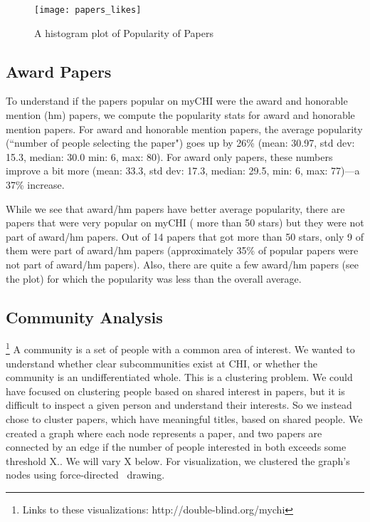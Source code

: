 \documentclass{sigchi}
\begin{document}
\begin{figure}[!h]
\centering
\texttt{[image: papers\_likes]}
\caption{A histogram plot of Popularity of Papers}
\label{fig:A histogram plot of Number of People Starred (any single paper)}
\end{figure}



\subsection{Award Papers}

To understand if the papers popular on myCHI were the award and honorable mention (hm) papers, we compute the popularity stats for award and honorable mention papers. For award and honorable mention papers, the average popularity (``number of people selecting the paper") goes up by 26\% (mean: 30.97, std dev: 15.3, median: 30.0 min: 6, max: 80). For award only papers, these numbers improve a bit more (mean: 33.3, std dev: 17.3,  median: 29.5, min: 6, max: 77)---a 37\% increase.

While we see that award/hm papers have better average popularity,  there are papers that were very popular on myCHI ( more than 50 stars) but they were not part of award/hm papers. Out of 14 papers that got more than 50 stars, only 9 of them were part of award/hm papers (approximately 35\% of popular papers were not part of award/hm papers). Also, there are quite a few award/hm papers (see the plot) for which the popularity was less than the overall average.





\subsection{Community Analysis}
\footnote[1]{Links to these visualizations: http://double-blind.org/mychi}
A community is a set of people with a common area of interest. We wanted to understand whether clear subcommunities exist at CHI, or whether the community is an undifferentiated whole.  This is a clustering problem. We could have focused on clustering people based on shared interest in papers, but it is difficult to inspect a given person and understand their interests.  So we instead chose to cluster papers, which have meaningful titles, based on shared people.  We created a graph where each node represents a paper, and two papers are connected by an edge if the number of people interested in both exceeds some threshold X..  We will vary X below.   For visualization, we clustered the graph's nodes using force-directed~\cite{Eades00navigatingclustered} drawing.
\end{document}

